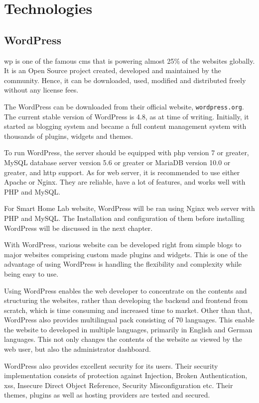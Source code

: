 \chapter{Technologies}
\section{WordPress}
\ac{wp} is one of the famous \ac{cms} that is powering almost 25\% of the websites globally. It is an Open Source project created, developed and maintained by the community. Hence, it can be downloaded, used, modified and distributed freely without any license fees.

The WordPress can be downloaded from their official website, \texttt{wordpress.org}. The current stable version of WordPress is 4.8, as at time of writing. Initially, it started as blogging system and became a full content management system with thousands of plugins, widgets and themes.

To run WordPress, the server should be equipped with \ac{php} version 7 or greater, MySQL database server version 5.6 or greater or MariaDB version 10.0 or greater, and \ac{http} support. As for web server, it is recommended to use either Apache or Nginx. They are reliable, have a lot of features, and works well with PHP and MySQL.

For Smart Home Lab website, WordPress will be ran using Nginx web server with PHP and MySQL. The Installation and configuration of them before installing WordPress will be discussed in the next chapter.

With WordPress, various website can be developed right from simple blogs to major websites comprising custom made plugins and widgets. This is one of the advantage of using WordPress is handling the flexibility and complexity while being easy to use.

Using WordPress enables the web developer to concentrate on the contents and structuring the websites, rather than developing the backend and frontend from scratch, which is time consuming and increased time to market.
Other than that, WordPress also provides multilingual pack consisting of 70 languages. This enable the website to developed in multiple languages, primarily in English and German languages. This not only changes the contents of the website as viewed by the web user, but also the administrator dashboard.

WordPress also provides excellent security for its users. Their security implementation consists of protection against Injection, Broken Authentication, \ac{xss}, Insecure Direct Object Reference, Security Misconfiguration etc. Their themes, plugins as well as hosting providers are tested and secured.

